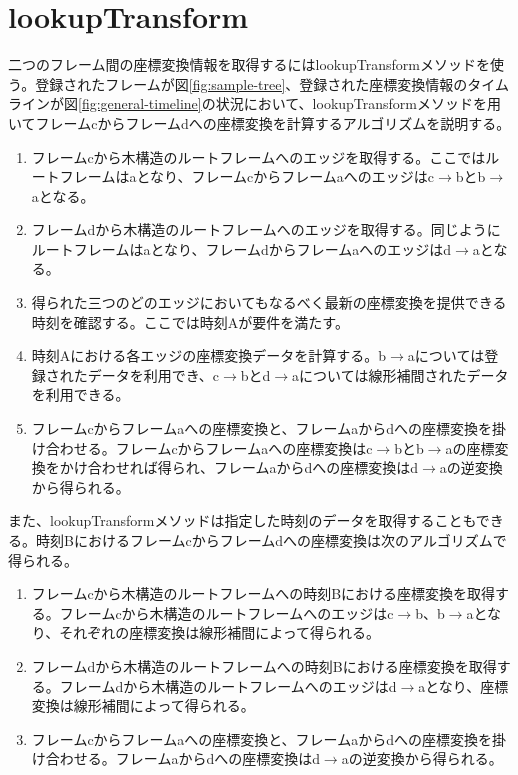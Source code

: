 \documentclass[a4paper]{jreport}	%
\begin{document}
\section{lookupTransform}
二つのフレーム間の座標変換情報を取得するにはlookupTransformメソッドを使う。登録されたフレームが図\ref{fig:sample-tree}、登録された座標変換情報のタイムラインが図\ref{fig:general-timeline}の状況において、lookupTransformメソッドを用いてフレームcからフレームdへの座標変換を計算するアルゴリズムを説明する。

\begin{enumerate}
	\item フレームcから木構造のルートフレームへのエッジを取得する。ここではルートフレームはaとなり、フレームcからフレームaへのエッジはc$\rightarrow$bとb$\rightarrow$aとなる。
	\item フレームdから木構造のルートフレームへのエッジを取得する。同じようにルートフレームはaとなり、フレームdからフレームaへのエッジはd$\rightarrow$aとなる。
	\item 得られた三つのどのエッジにおいてもなるべく最新の座標変換を提供できる時刻を確認する。ここでは時刻Aが要件を満たす。
	\item 時刻Aにおける各エッジの座標変換データを計算する。b$\rightarrow$aについては登録されたデータを利用でき、c$\rightarrow$bとd$\rightarrow$aについては線形補間されたデータを利用できる。
	\item フレームcからフレームaへの座標変換と、フレームaからdへの座標変換を掛け合わせる。フレームcからフレームaへの座標変換はc$\rightarrow$bとb$\rightarrow$aの座標変換をかけ合わせれば得られ、フレームaからdへの座標変換はd$\rightarrow$aの逆変換から得られる。
\end{enumerate}
また、lookupTransformメソッドは指定した時刻のデータを取得することもできる。時刻Bにおけるフレームcからフレームdへの座標変換は次のアルゴリズムで得られる。

\begin{enumerate}
	\item フレームcから木構造のルートフレームへの時刻Bにおける座標変換を取得する。フレームcから木構造のルートフレームへのエッジはc$\rightarrow$b、b$\rightarrow$aとなり、それぞれの座標変換は線形補間によって得られる。
	\item フレームdから木構造のルートフレームへの時刻Bにおける座標変換を取得する。フレームdから木構造のルートフレームへのエッジはd$\rightarrow$aとなり、座標変換は線形補間によって得られる。
	\item フレームcからフレームaへの座標変換と、フレームaからdへの座標変換を掛け合わせる。フレームaからdへの座標変換はd$\rightarrow$aの逆変換から得られる。
\end{enumerate}
\end{document}

